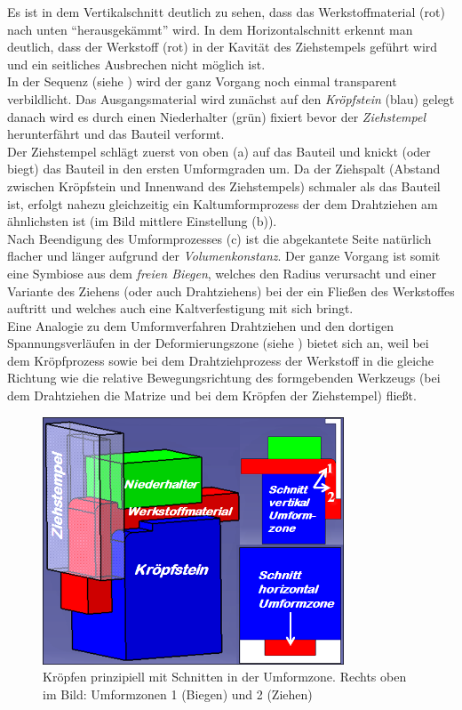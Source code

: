 \documentclass[12pt,a4paper,parskip,twoside,BCOR5mm,headsepline]{scrartcl}
\begin{document}
\begin{description*}
 Es ist in dem Vertikalschnitt deutlich zu sehen, dass das Werkstoffmaterial (rot) nach unten "`herausgekämmt"' wird. In dem Horizontalschnitt erkennt man deutlich,  dass der Werkstoff (rot) in der Kavität des Ziehstempels geführt wird und ein seitliches Ausbrechen nicht möglich ist.\\ In der Sequenz (siehe ) wird der ganz Vorgang noch einmal transparent verbildlicht. Das Ausgangsmaterial wird zunächst auf den \emph{Kröpfstein} (blau) gelegt danach wird es durch einen Niederhalter (grün) fixiert bevor der \emph{Ziehstempel} herunterfährt und das Bauteil verformt. \\    Der Ziehstempel schlägt zuerst von oben  (a) auf das Bauteil  und knickt (oder biegt) das Bauteil in den ersten Umformgraden um. Da der Ziehspalt (Abstand zwischen Kröpfstein und Innenwand des Ziehstempels) schmaler als das Bauteil ist, erfolgt nahezu gleichzeitig  ein Kaltumformprozess der dem Drahtziehen am ähnlichsten ist (im Bild mittlere Einstellung (b)). \\ Nach Beendigung des Umformprozesses (c) ist die abgekantete Seite natürlich flacher und länger aufgrund der \emph{Volumenkonstanz}. Der ganze Vorgang ist somit eine Symbiose aus dem \emph{freien Biegen}, welches den Radius verursacht und einer Variante des Ziehens (oder auch Drahtziehens) bei der ein Fließen des Werkstoffes auftritt und welches auch eine Kaltverfestigung mit sich bringt. \\
Eine Analogie zu dem Umformverfahren Drahtziehen und den dortigen Spannungsverläufen in der Deformierungszone (siehe ) bietet sich an, weil bei dem Kröpfprozess sowie bei dem Drahtziehprozess der Werkstoff in die gleiche Richtung wie die relative Bewegungsrichtung des  formgebenden Werkzeugs (bei dem Drahtziehen die Matrize und bei dem Kröpfen der Ziehstempel) fließt.\\
\begin{figure}[hbtp]
\centering
\includegraphics[width=0.8\textwidth]{krpfgesamt.png}
\caption{Kröpfen prinzipiell mit Schnitten in der Umformzone. Rechts oben im Bild: Umformzonen 1 (Biegen) und 2 (Ziehen)}
\label{fig:krpfgesamt}
\end{figure}




\end{description*}
\end{document}
